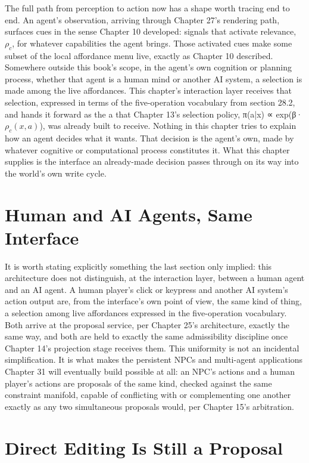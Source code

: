 The full path from perception to action now has a shape worth tracing end to end. An agent's observation, arriving through Chapter 27's rendering path, surfaces cues in the sense Chapter 10 developed: signals that activate relevance, \(\rho_c\), for whatever capabilities the agent brings. Those activated cues make some subset of the local affordance menu live, exactly as Chapter 10 described. Somewhere outside this book's scope, in the agent's own cognition or planning process, whether that agent is a human mind or another AI system, a selection is made among the live affordances. This chapter's interaction layer receives that selection, expressed in terms of the five-operation vocabulary from section 28.2, and hands it forward as the a that Chapter 13's selection policy, π(a|x) ∝ exp(β·\(\rho_c(x,a)\)), was already built to receive. Nothing in this chapter tries to explain how an agent decides what it wants. That decision is the agent's own, made by whatever cognitive or computational process constitutes it. What this chapter supplies is the interface an already-made decision passes through on its way into the world's own write cycle.

\section{Human and AI Agents, Same Interface}

It is worth stating explicitly something the last section only implied: this architecture does not distinguish, at the interaction layer, between a human agent and an AI agent. A human player's click or keypress and another AI system's action output are, from the interface's own point of view, the same kind of thing, a selection among live affordances expressed in the five-operation vocabulary. Both arrive at the proposal service, per Chapter 25's architecture, exactly the same way, and both are held to exactly the same admissibility discipline once Chapter 14's projection stage receives them. This uniformity is not an incidental simplification. It is what makes the persistent NPCs and multi-agent applications Chapter 31 will eventually build possible at all: an NPC's actions and a human player's actions are proposals of the same kind, checked against the same constraint manifold, capable of conflicting with or complementing one another exactly as any two simultaneous proposals would, per Chapter 15's arbitration.

\section{Direct Editing Is Still a Proposal}

